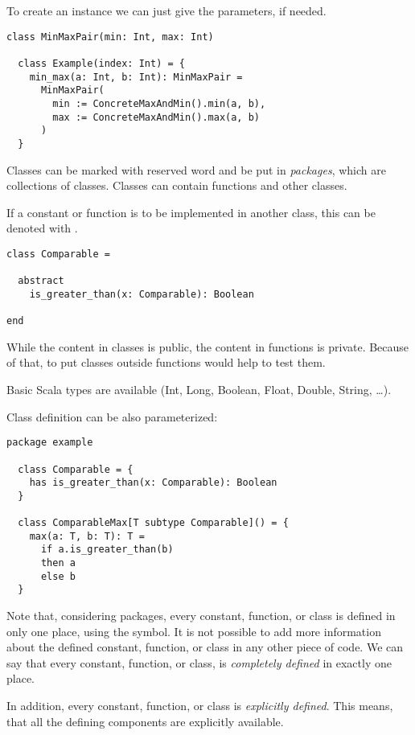 To create an instance we can just give the parameters, if needed.

\begin{lstlisting}[label={lst:exampleClassMaxAnInstance}]
  class MinMaxPair(min: Int, max: Int)

  class Example(index: Int) = {
    min_max(a: Int, b: Int): MinMaxPair =
      MinMaxPair(
        min := ConcreteMaxAndMin().min(a, b),
        max := ConcreteMaxAndMin().max(a, b)
      )
  }
\end{lstlisting}

Classes can be marked with \sodapackage reserved word and be put in \emph{packages}, which are collections of classes.
Classes can contain functions and other classes.

If a constant or function is to be implemented in another class, this can be denoted with \sodaabstract.

\begin{lstlisting}[label={lst:exampleAbstractFunction}]
class Comparable =

  abstract
    is_greater_than(x: Comparable): Boolean

end
\end{lstlisting}

While the content in classes is public, the content in functions is private.
Because of that, to put classes outside functions would help to test them.

Basic Scala types are available (Int, Long, Boolean, Float, Double, String, \ldots).

Class definition can be also parameterized:
\begin{lstlisting}[label={lst:exampleParameterizedClass}]
  package example

  class Comparable = {
    has is_greater_than(x: Comparable): Boolean
  }

  class ComparableMax[T subtype Comparable]() = {
    max(a: T, b: T): T =
      if a.is_greater_than(b)
      then a
      else b
  }
\end{lstlisting}

Note that, considering packages, every constant, function, or class is defined in only one place, using the \sodadef symbol.
It is not possible to add more information about the defined constant, function, or class in any other piece of code.
We can say that every constant, function, or class, is \emph{completely defined} in exactly one place.

In addition, every constant, function, or class is \emph{explicitly defined}.
This means, that all the defining components are explicitly available.

